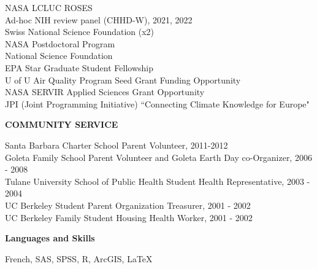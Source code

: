 \documentclass[11pt]{article} %
\begin{document}
\noindent
NASA LCLUC ROSES\\
Ad-hoc NIH review panel (CHHD-W), 2021, 2022\\
Swiss National Science Foundation (x2)\\
NASA Postdoctoral Program\\
National Science Foundation\\
EPA Star Graduate Student Fellowship\\
U of U Air Quality Program Seed Grant Funding Opportunity\\
NASA SERVIR Applied Sciences Grant Opportunity\\
JPI (Joint Programming Initiative) ``Connecting Climate Knowledge for Europe"\\






\vspace{.5cm}

\noindent
{\large \textbf{COMMUNITY SERVICE}}
\vspace{.5cm}


\noindent
Santa Barbara Charter School Parent Volunteer, 2011-2012\\
Goleta Family School Parent Volunteer and Goleta Earth Day co-Organizer, 2006 - 2008\\
Tulane University School of Public Health Student Health Representative, 2003 - 2004\\
UC Berkeley Student Parent Organization Treasurer, 2001 - 2002\\
UC Berkeley Family Student Housing Health Worker, 2001 - 2002\\

\vspace{.5cm}

\noindent
\textbf {Languages and Skills}

\noindent
French, 
SAS, SPSS, R, ArcGIS, \LaTeX\,  
\end{document}
